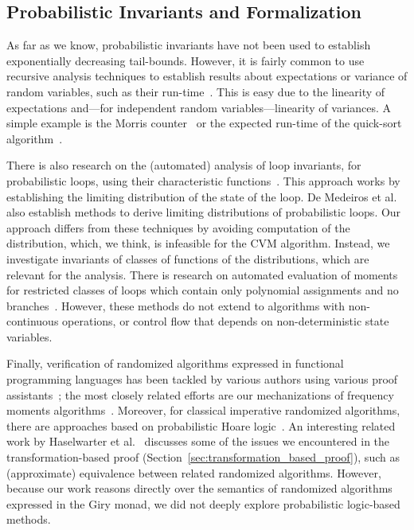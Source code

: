 \subsection{Probabilistic Invariants and Formalization}
As far as we know, probabilistic invariants have not been used to establish exponentially decreasing tail-bounds.
However, it is fairly common to use recursive analysis techniques to establish results about expectations or variance of random variables, such as their run-time~\cite[Section 1.4]{motwani1995}.
This is easy due to the linearity of expectations and---for independent random variables---linearity of variances.
A simple example is the Morris counter~\cite{morris1978} or the expected run-time of the quick-sort algorithm~\cite[Section 2.5]{mitzenmacher2017}.

There is also research on the (automated) analysis of loop invariants, for probabilistic loops, using their characteristic functions~\cite{batz2023, mciver2005}.
This approach works by establishing the limiting distribution of the state of the loop.
De Medeiros et al.~\cite[Section 3.2]{demedeiros2024} also establish methods to derive limiting distributions of probabilistic loops.
Our approach differs from these techniques by avoiding computation of the distribution, which, we think, is infeasible for the CVM algorithm.
Instead, we investigate invariants of classes of functions of the distributions, which are relevant for the analysis.
There is research on automated evaluation of moments for restricted classes of loops which contain only polynomial assignments and no branches~\cite{bartocci2019,kofnov2022}.
However, these methods do not extend to algorithms with non-continuous operations, or control flow that depends on non-deterministic state variables.

Finally, verification of randomized algorithms expressed in functional programming languages has been tackled by various authors using various proof assistants~\cite{audebaud2009,bosshard2024,demedeiros2024, eberl2020,gopinathan20,haslbeck2016,hurd03,Probabilistic_Prime_Tests-AFP,tan2024,tassarotti2021}; the most closely related efforts are our mechanizations of frequency moments algorithms~\cite{karayel2022, karayel2023}.
Moreover, for classical imperative randomized algorithms, there are approaches based on probabilistic Hoare logic~\cite{denhartog2002}.
An interesting related work by Haselwarter et al.~\cite{haselwarter2025} discusses some of the issues we encountered in the transformation-based proof (Section~\ref{sec:transformation_based_proof}), such as (approximate) equivalence between related randomized algorithms.
However, because our work reasons directly over the semantics of randomized algorithms expressed in the Giry monad, we did not deeply explore probabilistic logic-based methods.
